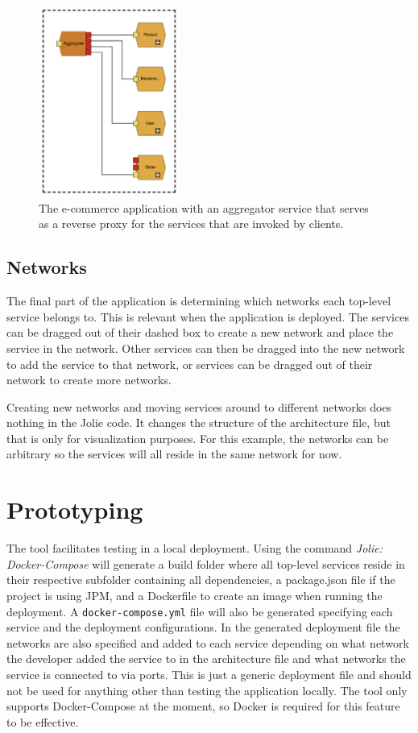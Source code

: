 \begin{figure}[h!]
    \center
    \includegraphics[width=0.41\textwidth]{figures/jv_aggregator.png}
    \caption{The e-commerce application with an aggregator service that serves as a reverse proxy for the services that are invoked by clients.}
    \label{figure:jv_aggregate}
\end{figure}

\subsection{Networks}
The final part of the application is determining which networks each top-level service belongs to. This is relevant when the application is deployed.
The services can be dragged out of their dashed box to create a new network and place the service in the network.
Other services can then be dragged into the new network to add the service to that network, or services can be dragged out of their network to create more networks.

Creating new networks and moving services around to different networks does nothing in the Jolie code. It changes the structure of the architecture file, but that is only for visualization purposes. 
For this example, the networks can be arbitrary so the services will all reside in the same network for now.

\section{Prototyping}
The tool facilitates testing in a local deployment. Using the command \textit{Jolie: Docker-Compose} will generate a build folder where all top-level services reside in their respective subfolder containing all dependencies, a package.json file if the project is using JPM, and a Dockerfile to create an image when running the deployment.
A \texttt{docker-compose.yml} file will also be generated specifying each service and the deployment configurations.
In the generated deployment file the networks are also specified and added to each service depending on what network the developer added the service to in the architecture file and what networks the service is connected to via ports.
This is just a generic deployment file and should not be used for anything other than testing the application locally.
The tool only supports Docker-Compose at the moment, so Docker is required for this feature to be effective.

